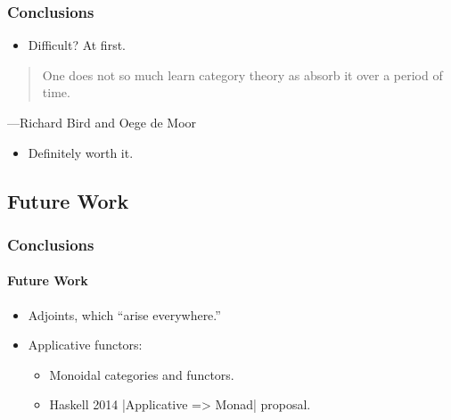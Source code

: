 \documentclass{beamer}
\begin{document}
\begin{frame}
  \frametitle{Conclusions}

  \begin{itemize}
  \item
    Difficult? At first.
  \end{itemize}
  \vfill
  \begin{quote}
    One does not so much learn category theory as absorb it over a
    period of time.
  \end{quote}
  \hfill ---Richard Bird and Oege de Moor \vfill
  \begin{itemize}
  \item
    Definitely worth it.
  \end{itemize}

\end{frame}


\subsection{Future Work}


\begin{frame}[fragile,label={future-work}]
  \frametitle{Conclusions}
  \framesubtitle{Future Work}

  \begin{itemize}
  \item
    Adjoints, which ``arise everywhere.''
  \end{itemize}
  \begin{itemize}
  \item
    Applicative functors:
    \begin{itemize}
    \item
      Monoidal categories and functors.
    \item
      Haskell 2014 |Applicative => Monad| proposal.
    \end{itemize}
  \end{itemize}

\end{frame}

\end{document}
